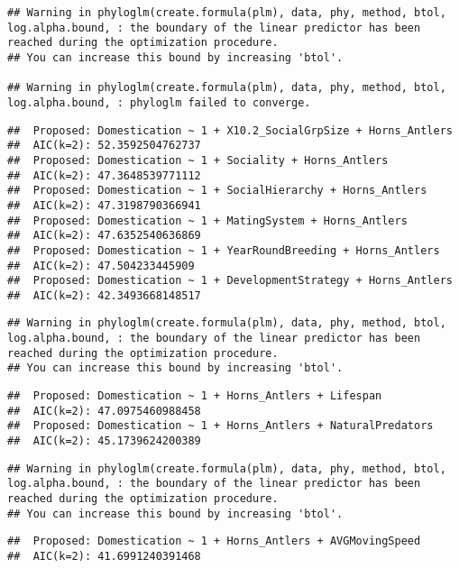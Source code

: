 \documentclass[
]{article}
\begin{document}
\begin{verbatim}
## Warning in phyloglm(create.formula(plm), data, phy, method, btol, log.alpha.bound, : the boundary of the linear predictor has been reached during the optimization procedure.
## You can increase this bound by increasing 'btol'.

## Warning in phyloglm(create.formula(plm), data, phy, method, btol, log.alpha.bound, : phyloglm failed to converge.
\end{verbatim}

\begin{verbatim}
##  Proposed: Domestication ~ 1 + X10.2_SocialGrpSize + Horns_Antlers
##  AIC(k=2): 52.3592504762737
##  Proposed: Domestication ~ 1 + Sociality + Horns_Antlers
##  AIC(k=2): 47.3648539771112
##  Proposed: Domestication ~ 1 + SocialHierarchy + Horns_Antlers
##  AIC(k=2): 47.3198790366941
##  Proposed: Domestication ~ 1 + MatingSystem + Horns_Antlers
##  AIC(k=2): 47.6352540636869
##  Proposed: Domestication ~ 1 + YearRoundBreeding + Horns_Antlers
##  AIC(k=2): 47.504233445909
##  Proposed: Domestication ~ 1 + DevelopmentStrategy + Horns_Antlers
##  AIC(k=2): 42.3493668148517
\end{verbatim}

\begin{verbatim}
## Warning in phyloglm(create.formula(plm), data, phy, method, btol, log.alpha.bound, : the boundary of the linear predictor has been reached during the optimization procedure.
## You can increase this bound by increasing 'btol'.
\end{verbatim}

\begin{verbatim}
##  Proposed: Domestication ~ 1 + Horns_Antlers + Lifespan
##  AIC(k=2): 47.0975460988458
##  Proposed: Domestication ~ 1 + Horns_Antlers + NaturalPredators
##  AIC(k=2): 45.1739624200389
\end{verbatim}

\begin{verbatim}
## Warning in phyloglm(create.formula(plm), data, phy, method, btol, log.alpha.bound, : the boundary of the linear predictor has been reached during the optimization procedure.
## You can increase this bound by increasing 'btol'.
\end{verbatim}

\begin{verbatim}
##  Proposed: Domestication ~ 1 + Horns_Antlers + AVGMovingSpeed
##  AIC(k=2): 41.6991240391468
\end{verbatim}
\end{document}
